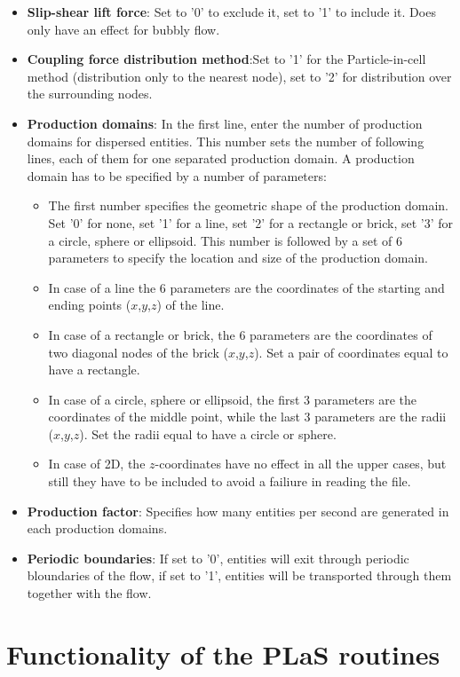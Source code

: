 \documentclass[12pt]{article}
\begin{document}
\begin{itemize}
\item {\bf Slip-shear lift force}: Set to '0' to exclude it, set to '1' to include it. Does only have an effect for bubbly flow.
\item {\bf Coupling force distribution method}:Set to '1' for the Particle-in-cell method (distribution only to the nearest node), set to '2' for distribution over the surrounding nodes.
\item {\bf Production domains}: In the first line, enter the number of production domains for dispersed entities. This number sets the number of following lines, each of them for one separated production domain. A production domain has to be specified by a number of parameters:
\begin{itemize}
\item The first number specifies the geometric shape of the production domain. Set '0' for none, set '1' for a line, set '2' for a rectangle or brick, set '3' for a circle, sphere or ellipsoid. This number is followed by a set of 6 parameters to specify the location and size of the production domain.
\item In case of a line the 6 parameters are the coordinates of the starting and ending points ($x$,$y$,$z$) of the line.
\item In case of a rectangle or brick, the 6 parameters are the coordinates of two diagonal nodes of the brick ($x$,$y$,$z$). Set a pair of coordinates equal to have a rectangle.
\item In case of a circle, sphere or ellipsoid, the first 3 parameters are the coordinates of the middle point, while the last 3 parameters are the radii ($x$,$y$,$z$). Set the radii equal to have a circle or sphere. 
\item In case of 2D, the $z$-coordinates have no effect in all the upper cases, but still they have to be included to avoid a failiure in reading the file.
\end{itemize}
\item {\bf Production factor}: Specifies how many entities per second are generated in each production domains.
\item {\bf Periodic boundaries}: If set to '0', entities will exit through periodic bloundaries of the flow, if set to '1', entities will be transported through them together with the flow.
\end{itemize}

\newpage
\section{Functionality of the PLaS routines}
\label{sec:routines}
\end{document}
